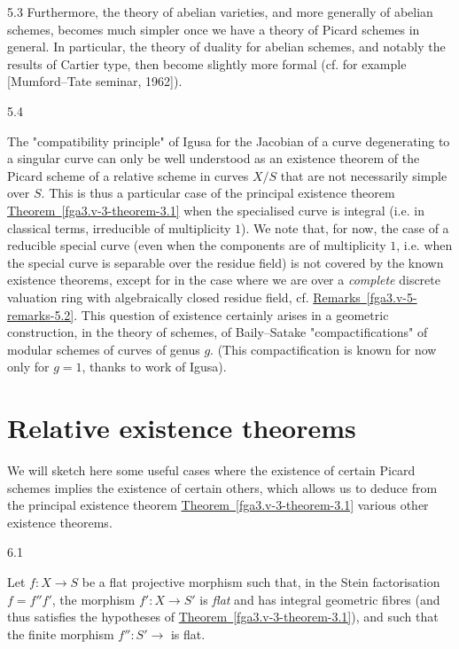 \begin{remark}{5.3}
    Furthermore, the theory of abelian varieties, and more generally of abelian schemes, becomes much simpler once we have a theory of Picard schemes in general.
    In particular, the theory of duality for abelian schemes, and notably the results of Cartier type, then become slightly more formal (cf. for example [Mumford–Tate seminar, 1962]).\end{remark}\begin{remarks}{5.4}\label{fga3.v-5-remarks-5.4}\skipsinglepar\par{}The "compatibility principle" of Igusa for the Jacobian of a curve degenerating to a singular curve can only be well understood as an existence theorem of the Picard scheme of a relative scheme in curves \(X/S\) that are not necessarily simple over \(S\).
    This is thus a particular case of the principal existence theorem \hyperref[fga3.v-3-theorem-3.1]{Theorem~\ref*{fga3.v-3-theorem-3.1}} when the specialised curve is integral (i.e. in classical terms, irreducible of multiplicity \(1\)).
    We note that, for now, the case of a reducible special curve (even when the components are of multiplicity \(1\), i.e. when the special curve is separable over the residue field) is not covered by the known existence theorems, except for in the case where we are over a \emph{complete} discrete valuation ring with algebraically closed residue field, cf. \hyperref[fga3.v-5-remarks-5.2]{Remarks~\ref*{fga3.v-5-remarks-5.2}}.
    This question of existence certainly arises in a geometric construction, in the theory of schemes, of Baily–Satake "compactifications" of modular schemes of curves of genus \(g\).
    (This compactification is known for now only for \(g=1\), thanks to work of Igusa).\end{remarks}\chapter{Relative existence theorems}\thispagestyle{fancy}\label{fga3.v-6}\par{}We will sketch here some useful cases where the existence of certain Picard schemes implies the existence of certain others, which allows us to deduce from the principal existence theorem \hyperref[fga3.v-3-theorem-3.1]{Theorem~\ref*{fga3.v-3-theorem-3.1}} various other existence theorems.\begin{proposition}{6.1}\label{fga3.v-6-proposition-6.1}\skipsinglepar\par{}Let \(f\colon  X\to  S\) be a flat projective morphism such that, in the Stein factorisation \(f=f''f'\), the morphism \(f'\colon  X\to  S'\) is \emph{flat} and has integral geometric fibres (and thus satisfies the hypotheses of \hyperref[fga3.v-3-theorem-3.1]{Theorem~\ref*{fga3.v-3-theorem-3.1}}), and such that the finite morphism \(f''\colon  S'\to \) is flat.

\end{proposition}
